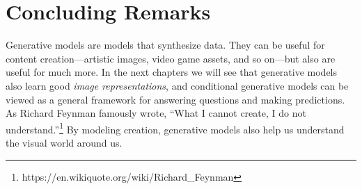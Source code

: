 

\section{Concluding Remarks}
Generative models are models that synthesize data. They can be useful for content creation—artistic images, video game assets, and so on—but also are useful for much more. In the next chapters we will see that generative models also learn good \textit{image representations}, and conditional generative models can be viewed as a general framework for answering questions and making predictions. As Richard Feynman famously wrote, ``What I cannot create, I do not understand.''\footnote{https://en.wikiquote.org/wiki/Richard\_Feynman} By modeling creation, generative models also help us understand the visual world around us.



